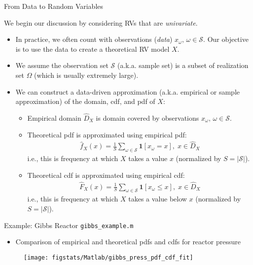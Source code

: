 \documentclass[handout,9pt]{beamer}
\begin{document}
\begin{frame}{From Data to Random Variables}
\begin{block}{}
We begin our discussion by considering RVs that are {\em univariate}.
\end{block}
\begin{itemize}
 \setlength{\itemsep}{5pt}
\item In practice, we often count with observations ({\em data}) $x_\omega,\, \omega \in \mathcal{S}$. Our objective is to use the data to create a theoretical RV model $X$. 
\item We assume the observation set $\mathcal{S}$ (a.k.a. sample set) is a subset of realization set $\Omega$ (which is usually extremely large). 

\item We can construct a data-driven approximation (a.k.a. empirical or sample approximation) of the domain, cdf, and pdf of $X$:

\begin{itemize}
 \setlength{\itemsep}{10pt}
\item Empirical domain $\hat{D}_X$ is domain covered by observations $x_\omega,\, \omega \in \mathcal{S}$.
\item Theoretical pdf is approximated using empirical pdf: 
\begin{align*}
\hat{f}_X(x)=\frac{1}{S}\sum_{\omega \in \mathcal{S}}\mathbf{1}[x_\omega= x],\; x\in \hat{D}_X
\end{align*}
i.e., this is frequency at which $X$ takes a value $x$ (normalized by $S=|\mathcal{S}|$). 
\item Theoretical cdf is approximated using empirical cdf:
\begin{align*}
\hat{F}_X(x)=\frac{1}{S}\sum_{\omega \in \mathcal{S}}\mathbf{1}[x_\omega\leq x],\; x\in \hat{D}_X
\end{align*}
i.e., this is frequency at which $X$ takes a value below $x$ (normalized by $S=|\mathcal{S}|$). 
\end{itemize}
\end{itemize}
\end{frame}

\begin{frame}{Example: Gibbs Reactor \footnotesize{\texttt{gibbs\_example.m}}}

\begin{itemize}
\item Comparison of empirical and theoretical pdfs and cdfs for reactor pressure
\end{itemize}
\begin{figure}[!htb]
    \centering
	\texttt{[image: figstats/Matlab/gibbs\_press\_pdf\_cdf\_fit]}
\end{figure}

\end{frame}
\end{document}

